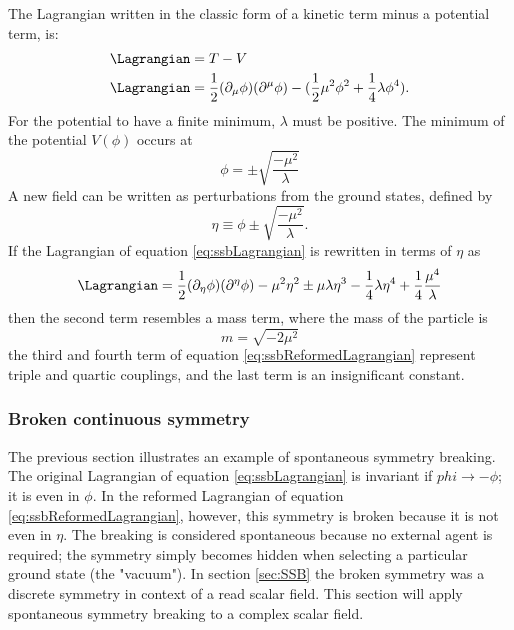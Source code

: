 The Lagrangian written in the classic form of a kinetic term minus a potential term, is:
\begin{align}
    \Lagrangian & = T-V\\
    \Lagrangian & = \dfrac{1}{2}(\partial_{\mu}\phi)(\partial^{\mu}\phi)-(\dfrac{1}{2}\mu^2\phi^2+\dfrac{1}{4}\lambda\phi^4).
    \label{eq:ssbLagrangian}
\end{align}
For the potential to have a finite minimum, $\lambda$ must be positive. The minimum of the potential $V(\phi)$ occurs at 
\begin{equation}
    \phi=\pm\sqrt{\dfrac{-\mu^2}{\lambda}}
\end{equation}
A new field can be written as perturbations from the ground states, defined by 
\begin{equation}
    \eta\equiv\phi\pm\sqrt{\dfrac{-\mu^2}{\lambda}}.
\end{equation}
If the Lagrangian of equation \ref{eq:ssbLagrangian} is rewritten in terms of $\eta$ as
\begin{equation} \label{eq:ssbReformedLagrangian}
    \Lagrangian=\dfrac{1}{2}(\partial_{\eta}\phi)(\partial^{\eta}\phi) - \mu^2\eta^2\pm\mu\lambda\eta^3-\dfrac{1}{4}\lambda\eta^4+\dfrac{1}{4}\dfrac{\mu^4}{\lambda}
\end{equation}
then the second term resembles a mass term, where the mass of the particle is 
\begin{equation}
    m=\sqrt{-2\mu^2}
\end{equation}
the third and fourth term of equation \ref{eq:ssbReformedLagrangian} represent triple and quartic couplings, and the last term is an insignificant constant. 

\subsubsection{Broken continuous symmetry}

The previous section illustrates an example of spontaneous symmetry breaking. The original Lagrangian of equation \ref{eq:ssbLagrangian} is invariant if $phi\rightarrow-\phi$; it is even in $\phi$. In the reformed Lagrangian of equation \ref{eq:ssbReformedLagrangian}, however, this symmetry is broken because it is not even in $\eta$. The breaking is considered spontaneous because no external agent is required; the symmetry simply becomes hidden when selecting a particular ground state (the "vacuum"). In section \ref{sec:SSB} the broken symmetry was a discrete symmetry in context of a read scalar field. This section will apply spontaneous symmetry breaking to a complex scalar field.

